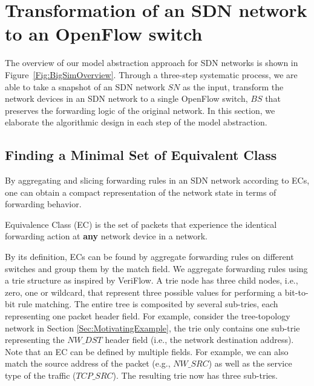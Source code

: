 \section{Transformation of an SDN network to an OpenFlow switch}
\label{Sec:Design}

The overview of our model abstraction approach for SDN networks is shown in Figure~\ref{Fig:BigSimOverview}. Through a three-step systematic process, we are able to take 
a snapshot of an SDN network $SN$ as the input, transform the network devices in an SDN network to a single OpenFlow switch, $BS$ that preserves the forwarding logic of the original network. In this section, we elaborate the algorithmic design in each step of the model abstraction.

\subsection{Finding a Minimal Set of Equivalent Class}
By aggregating and slicing forwarding rules in an SDN network according to ECs, one can obtain a compact representation of the network state in terms of forwarding behavior. 

\begin{definition}
Equivalence Class (EC) is the set of packets that experience the identical forwarding action at \textbf{any} network device in a network. 
\label{Def:EC}
\end{definition}

By its definition, ECs can be found by aggregate forwarding rules on different switches
and group them by the match field.
We aggregate forwarding rules using a trie structure as inspired by VeriFlow\cite{Veriflow}. 
A trie node has three child nodes, i.e., zero, one or wildcard, that represent three possible values for performing a bit-to-bit rule matching.
The entire tree is composited by several sub-tries, each representing one packet header field. For example, consider the tree-topology network in Section \ref{Sec:MotivatingExample}, the trie only contains one sub-trie representing the $NW\_DST$ header field (i.e., the network destination address). Note that an EC can be defined by multiple fields. For example, we can also match the source address of the packet (e.g., $NW\_SRC$) as well as the service type of the traffic ($TCP\_SRC$). The resulting trie now has three sub-tries.

